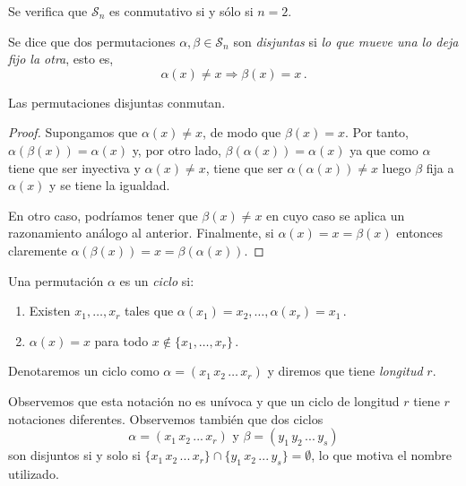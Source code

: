 Se verifica que $\mathcal S_n$ es conmutativo si y sólo si $n=2$.

\begin{ndef}
Se dice que dos permutaciones $\alpha,\beta \in \mathcal S_n$ son \textit{disjuntas} si \textit{lo que mueve una lo deja fijo la otra}, esto es, \begin{equation*}
  \alpha(x) \neq x \Rightarrow \beta(x) = x\,.
\end{equation*}
\end{ndef}

\begin{nprop} 
Las permutaciones disjuntas conmutan.
\end{nprop}
\begin{proof}
Supongamos que $	\alpha(x) \neq x$, de modo que $\beta(x) = x$. Por tanto, $\alpha(\beta(x)) = \alpha(x)$ y, por otro lado, $\beta(\alpha(x)) = \alpha(x)$ ya que como $\alpha$ tiene que ser inyectiva y $\alpha(x) \neq x$, tiene que ser $\alpha(\alpha(x)) \neq x$ luego $\beta$ fija a $\alpha(x)$ y se tiene la igualdad.

En otro caso, podríamos tener que $\beta(x) \neq x$ en cuyo caso se aplica un razonamiento análogo al anterior. Finalmente, si $\alpha(x) = x = \beta(x)$ entonces claremente $\alpha(\beta(x)) = x = \beta(\alpha(x))$.
\end{proof}

\begin{ndef}[Ciclo]

Una permutación $\alpha$ es un \textit{ciclo} si: \begin{enumerate}
  \item Existen $x_1, \dots, x_r$ tales que $\alpha(x_1) = x_2, \hdots, \alpha(x_r) = x_1$\,.
  \item $\alpha(x) = x$ para todo $x \notin \{x_1,\hdots,x_r\}$\,.
\end{enumerate}

Denotaremos un ciclo como  $\alpha = (x_1 \, x_2 \, \hdots \, x_r)$ y diremos que tiene \textit{longitud} $r$.
\end{ndef}

Observemos que esta notación no es unívoca y que un ciclo de longitud $r$ tiene $r$ notaciones diferentes. Observemos también que dos ciclos \begin{equation*}
  \alpha = (x_1 \, x_2 \, ... \, x_r) \text{ y } \beta = (y_1 \, y_2 \, ... \, y_s)
\end{equation*}son disjuntos si y solo si $\{x_1 \, x_2 \, ... \, x_r \} \cap \{y_1 \, x_2 \, ... \, y_s \} = \emptyset$, lo que motiva el nombre utilizado.

